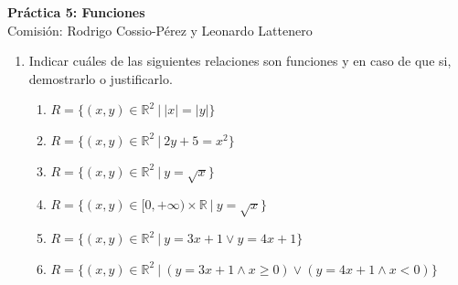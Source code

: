 \documentclass[a4paper]{article}
\newcommand{\exercise}{\item}
\begin{document}
\noindent \hrulefill 
\vspace{-7pt}
\begin{center} 
	\textbf{ Práctica 5: Funciones} \\
	Comisión: Rodrigo Cossio-Pérez y Leonardo Lattenero
\end{center}
\vspace{-10pt}
\hrulefill


\begin{enumerate}

	\exercise Indicar cuáles de las siguientes relaciones son funciones y en caso de que si, demostrarlo o justificarlo.
	\begin{enumerate} [label=(\alph*)]
		\item $R=\{(x,y)\in\mathbb{R}^2 ~|~ |x|=|y|\}$

		\item $R=\{(x,y)\in\mathbb{R}^2 ~|~ 2y+5=x^2 \}$

		\item $R=\{(x,y)\in\mathbb{R}^2 ~|~ y=\sqrt{x} \}$

		\item $R=\{(x,y)\in [0,+\infty)\times\mathbb{R} ~|~ y=\sqrt{x} \}$

		\item $R=\{(x,y)\in\mathbb{R}^2 ~|~ y=3x+1 \lor y=4x+1 \}$

		\item $R=\{(x,y)\in\mathbb{R}^2 ~|~ (y=3x+1 \land x\geq0) \lor (y=4x+1 \land x<0) \}$

	\end{enumerate}


\end{enumerate}
\end{document}
